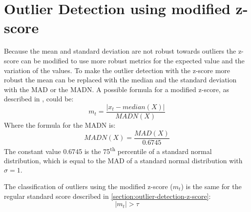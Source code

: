 \section{Outlier Detection using modified z-score}
Because the mean and standard deviation are not robust towards outliers the z-score can be modified to use more robust metrics for the expected value and the variation of the values. To make the outlier detection with the z-score more robust the mean can be replaced with the median and the standard deviation with the \ac{MAD} or the \ac{MADN}. A possible formula for a modified z-score, as described in \cite{baeOutlierDetectionSmoothing2019}, could be:
\begin{equation}
  m_t = \frac{|x_t - median(X)|}{MADN(X)}
\end{equation}
Where the formula for the \ac{MADN} is:
\begin{equation}
  MADN(X) = \frac{MAD(X)}{0.6745}
\end{equation}
The constant value 0.6745 is the 75\textsuperscript{th} percentile of a standard normal distribution, which is equal to the \ac{MAD} of a standard normal distribution with $\sigma = 1$.
\cite{baeOutlierDetectionSmoothing2019}
\par
The classification of outliers using the modified z-score ($m_t$) is the same for the regular standard score described in \autoref{section:outlier-detection-z-score}:
\begin{equation}
  |m_t| > \tau
\end{equation}


